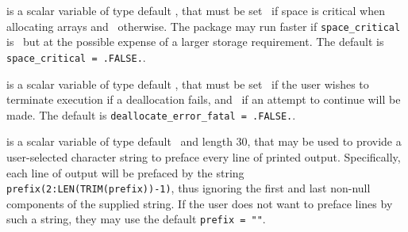 \begin{description}
 is a scalar variable of type default \logical,
that must be set \true\ if space is critical when allocating arrays
and  \false\ otherwise. The package may run faster if
{\tt space\_critical} is \false\ but at the possible expense of a larger
storage requirement. The default is {\tt space\_critical = .FALSE.}.

 is a scalar variable of type default \logical,
that must be set \true\ if the user wishes to terminate execution if
a deallocation  fails, and \false\ if an attempt to continue
will be made. The default is {\tt deallocate\_error\_fatal = .FALSE.}.

 is a scalar variable of type default \character\
and length 30, that may be used to provide a user-selected
character string to preface every line of printed output.
Specifically, each line of output will be prefaced by the string
{\tt prefix(2:LEN(TRIM(prefix))-1)},
thus ignoring the first and last non-null components of the
supplied string. If the user does not want to preface lines by such
a string, they may use the default {\tt prefix = ""}.

\end{description}
